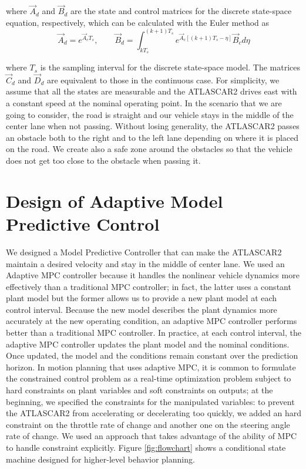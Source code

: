 where $\vec{A}_d$ and $\vec{B}_d$ are the state and control matrices for the discrete state-space equation, respectively, which can be calculated with the Euler method as
\begin{equation}
\vec{A}_d = e^{\vec{A}_cT_s},\qquad \vec{B}_d = \int_{kT_s}^{(k+1)T_s} e^{\vec{A}_c[(k+1)T_s-\eta]}\vec{B}_c d\eta
\end{equation}

where $T_s$ is the sampling interval for the discrete state-space model. The matrices $\vec{C}_d$ and $\vec{D}_d$ are equivalent to those in the continuous case. For simplicity, we assume that all the states are measurable and the ATLASCAR2 drives east with a constant speed at the nominal operating point. In the scenario that we are going to consider, the road is straight and our vehicle stays in the middle of the center lane when not passing. Without losing generality, the ATLASCAR2 passes an obstacle both to the right and to the left lane depending on where it is placed on the road. We create also a safe zone around the obstacles so that the vehicle does not get too close to the obstacle when passing it.

\section{Design of Adaptive Model Predictive Control}
We designed a Model Predictive Controller that can make the ATLASCAR2 maintain a desired velocity and stay in the middle of center lane. We used an Adaptive MPC controller because it handles the nonlinear vehicle dynamics more effectively than a traditional MPC controller; in fact, the latter uses a constant plant model but the former allows us to provide a new plant model at each control interval. Because the new model describes the plant dynamics more accurately at the new operating condition, an adaptive MPC controller performs better than a traditional MPC controller. In practice, at each control interval, the adaptive MPC controller updates the plant model and the nominal conditions. Once updated, the model and the conditions remain constant over the prediction horizon. In motion planning that uses adaptive MPC, it is common to formulate the constrained control problem as a real-time optimization problem subject to hard constraints on plant variables and soft constraints on outputs; at the beginning, we specified the constraints for the manipulated variables: to prevent the ATLASCAR2 from accelerating or decelerating too quickly, we added an hard constraint on the throttle rate of change and another one on the steering angle rate of change. We used an approach that takes advantage of the ability of MPC to handle constraint explicitly. Figure \ref{fig:flowchart} shows a conditional state machine designed for higher-level behavior planning.

